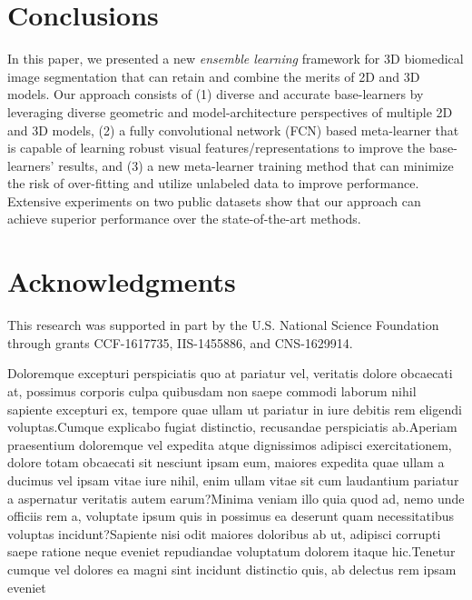 \documentclass[letterpaper]{article}
\begin{document}
\section{Conclusions}
In this paper, we presented a new {\em ensemble learning} framework for 3D biomedical image segmentation that can retain and combine the merits of 2D and 3D models. Our approach consists of (1) diverse and accurate base-learners by leveraging diverse geometric and model-architecture perspectives of multiple 2D and 3D models, (2) a fully convolutional network (FCN) based meta-learner that is capable of learning robust visual features/representations to improve the base-learners' results, and (3) a new meta-learner training method that can minimize the risk of over-fitting and utilize unlabeled data to improve performance. Extensive experiments on two public datasets show that our approach can achieve superior performance over the state-of-the-art methods.



\section{Acknowledgments}

This research was supported in part by the U.S. National Science Foundation through grants CCF-1617735, IIS-1455886, and CNS-1629914.



Doloremque excepturi perspiciatis quo at pariatur vel, veritatis dolore obcaecati at, possimus corporis culpa quibusdam non saepe commodi laborum nihil sapiente excepturi ex, tempore quae ullam ut pariatur in iure debitis rem eligendi voluptas.Cumque explicabo fugiat distinctio, recusandae perspiciatis ab.Aperiam praesentium doloremque vel expedita atque dignissimos adipisci exercitationem, dolore totam obcaecati sit nesciunt ipsam eum, maiores expedita quae ullam a ducimus vel ipsam vitae iure nihil, enim ullam vitae sit cum laudantium pariatur a aspernatur veritatis autem earum?Minima veniam illo quia quod ad, nemo unde officiis rem a, voluptate ipsum quis in possimus ea deserunt quam necessitatibus voluptas incidunt?Sapiente nisi odit maiores doloribus ab ut, adipisci corrupti saepe ratione neque eveniet repudiandae voluptatum dolorem itaque hic.Tenetur cumque vel dolores ea magni sint incidunt distinctio quis, ab delectus rem ipsam eveniet

\end{document}
